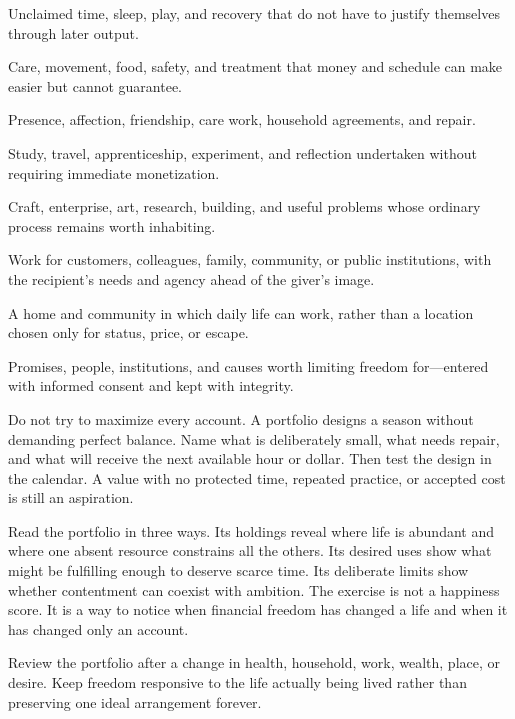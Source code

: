 \begin{description}[leftmargin=2.8em,style=nextline]
\item[Rest] Unclaimed time, sleep, play, and recovery that do not have to
  justify themselves through later output.
\item[Health] Care, movement, food, safety, and treatment that money and
  schedule can make easier but cannot guarantee.
\item[People] Presence, affection, friendship, care work, household
  agreements, and repair.
\item[Learning] Study, travel, apprenticeship, experiment, and reflection
  undertaken without requiring immediate monetization.
\item[Making] Craft, enterprise, art, research, building, and useful problems
  whose ordinary process remains worth inhabiting.
\item[Service] Work for customers, colleagues, family, community, or public
  institutions, with the recipient's needs and agency ahead of the giver's
  image.
\item[Place] A home and community in which daily life can work, rather than a
  location chosen only for status, price, or escape.
\item[Chosen obligations] Promises, people, institutions, and causes worth
  limiting freedom for---entered with informed consent and kept with
  integrity.
\end{description}

Do not try to maximize every account. A portfolio designs a season without
demanding perfect balance. Name what is deliberately small, what needs
repair, and what will receive the next available hour or dollar. Then test the
design in the calendar. A value with no protected time, repeated practice, or
accepted cost is still an aspiration.

Read the portfolio in three ways. Its holdings reveal where life is abundant
and where one absent resource constrains all the others. Its desired uses show
what might be fulfilling enough to deserve scarce time. Its deliberate limits
show whether contentment can coexist with ambition. The exercise is not a
happiness score. It is a way to notice when financial freedom has changed a
life and when it has changed only an account.

Review the portfolio after a change in health, household, work, wealth, place,
or desire. Keep freedom responsive to the life actually being lived rather
than preserving one ideal arrangement forever.

